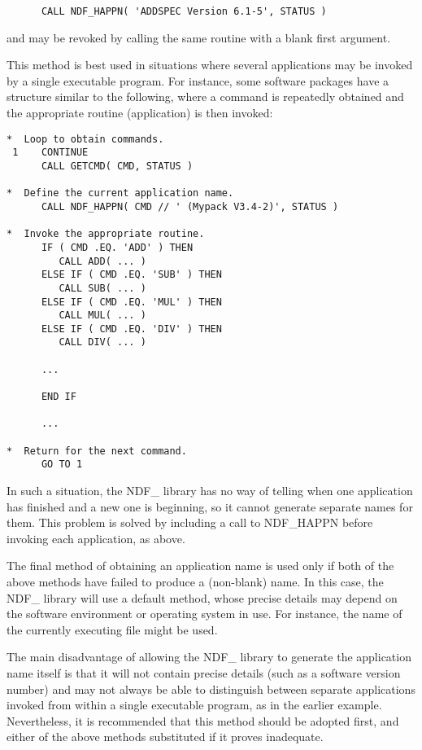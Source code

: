 \documentclass[twoside,11pt]{article}
\begin{document}
\small
\begin{verbatim}
      CALL NDF_HAPPN( 'ADDSPEC Version 6.1-5', STATUS )
\end{verbatim}
\normalsize

and may be revoked by calling the same routine with a blank first
argument.

This method is best used in situations where several applications may
be invoked by a single executable program. For instance, some software
packages have a structure similar to the following, where a command is
repeatedly obtained and the appropriate routine (application) is then
invoked:

\small
\begin{verbatim}
*  Loop to obtain commands.
 1    CONTINUE
      CALL GETCMD( CMD, STATUS )

*  Define the current application name.
      CALL NDF_HAPPN( CMD // ' (Mypack V3.4-2)', STATUS )

*  Invoke the appropriate routine.
      IF ( CMD .EQ. 'ADD' ) THEN
         CALL ADD( ... )
      ELSE IF ( CMD .EQ. 'SUB' ) THEN
         CALL SUB( ... )
      ELSE IF ( CMD .EQ. 'MUL' ) THEN
         CALL MUL( ... )
      ELSE IF ( CMD .EQ. 'DIV' ) THEN
         CALL DIV( ... )
      
      ...

      END IF

      ...

*  Return for the next command.
      GO TO 1
\end{verbatim}
\normalsize

In such a situation, the NDF\_ library has no way of telling when one
application has finished and a new one is beginning, so it cannot
generate separate names for them. This problem is solved by including
a call to NDF\_HAPPN before invoking each application, as above.

The final method of obtaining an application name is used only if both
of the above methods have failed to produce a (non-blank) name. In
this case, the NDF\_ library will use a default method, whose precise
details may depend on the software environment or operating system in
use. For instance, the name of the currently executing file might be
used.

The main disadvantage of allowing the NDF\_ library to generate the
application name itself is that it will not contain precise details
(such as a software version number) and may not always be able to
distinguish between separate applications invoked from within a single
executable program, as in the earlier example. Nevertheless, it is
recommended that this method should be adopted first, and either of
the above methods substituted if it proves inadequate.
\end{document}
